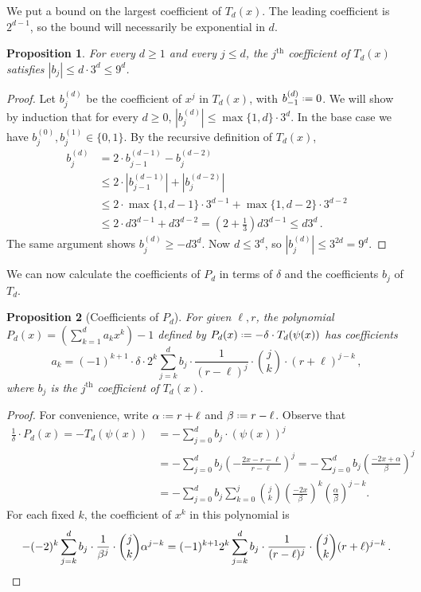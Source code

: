 \documentclass[10pt,a4paper]{article}
\newtheorem{proposition}{Proposition}[section]
\newcommand*{\define}{\mathrel{\vcenter{\baselineskip0.5ex \lineskiplimit0pt
                      \hbox{\scriptsize.}\hbox{\scriptsize.}}}%
                      =}
\newcommand{\zo}{\{0,1\}}
\begin{document}
We put a bound on the largest coefficient of $T_d(x)$. The leading coefficient is $2^{d-1}$, so the
bound will necessarily be exponential in $d$.

\begin{proposition}
\label{res:cheb_coefficient_ub}
For every $d \geq 1$ and every $j \leq d$, the $j^\text{th}$ coefficient of $T_d(x)$
satisfies $|b_j| \leq d \cdot 3^d \leq 9^d$.
\end{proposition}
\begin{proof}
Let $b^{(d)}_j$ be the coefficient of $x^j$ in $T_d(x)$, with $b^{(d)}_{-1} \define 0$. We will
show by induction that for every $d \ge 0$, $|b^{(d)}_j| \leq \max\{1,d\} \cdot 3^d$. In the base
case we have $b^{(0)}_j, b^{(1)}_j \in \zo$. By the recursive definition of $T_d(x)$,
\begin{align*}
  b^{(d)}_j &= 2 \cdot b^{(d-1)}_{j-1} - b^{(d-2)}_j \\
            &\leq 2 \cdot |b^{(d-1)}_{j-1}| + |b^{(d-2)}_j| \\
            &\leq 2 \cdot \max\{1,d-1\} \cdot 3^{d-1} + \max\{1,d-2\} \cdot 3^{d-2} \\
            &\leq 2 \cdot d 3^{d-1} + d 3^{d-2}
            = \left(2 + \frac{1}{3}\right) d 3^{d-1} \leq d 3^d \,.
\end{align*}
The same argument shows $b^{(d)}_j \geq - d 3^d$. Now $d \le 3^d$, so $|b^{(d)}_j| \leq 3^{2d} =
9^d$.
\end{proof}

We can now calculate the coefficients of $P_d$ in terms of $\delta$ and the coefficients $b_j$ of
$T_d$.

\begin{proposition}[Coefficients of $P_d$]
\label{res:coefficients_P}
For given $\ell, r$, the polynomial $P_d(x) = \left(\sum_{k=1}^d a_k x^k\right) - 1$ defined by
$P_d(x) \define -\delta \cdot T_d(\psi(x))$ has coefficients
\[
    a_k = (-1)^{k+1} \cdot 
    \delta \cdot 2^k \sum_{j=k}^d b_j \cdot \frac{1}{(r-\ell)^j} \cdot \binom{j}{k}
\cdot (r+\ell)^{j-k} \,,
\]
where $b_j$ is the $j^\text{th}$ coefficient of $T_d(x)$.
\end{proposition}
\begin{proof}
For convenience, write $\alpha \define r+\ell$ and $\beta \define r - \ell$.
Observe that
\begin{align*}
\frac{1}{\delta} \cdot P_d(x)
  = -T_d(\psi(x)) 
  &= -\sum_{j=0}^d b_j \cdot (\psi(x))^j \\
  &= -\sum_{j=0}^d b_j \left(-\frac{2x - r - \ell}{r - \ell}\right)^j 
   = -\sum_{j=0}^d b_j \left(\frac{-2x + \alpha}{\beta}\right)^j  \\
  &= -\sum_{j=0}^d b_j \sum_{k=0}^j \binom{j}{k}
        \left(\frac{-2x}{\beta}\right)^k \left(\frac{\alpha}{\beta}\right)^{j-k}.
\end{align*}
For each fixed $k$, the coefficient of $x^k$ in this polynomial is
\[
  -(-2)^k \sum_{j=k}^d b_j \cdot \frac{1}{\beta^j} \cdot \binom{j}{k} \alpha^{j-k} 
  = (-1)^{k+1} 2^k \sum_{j=k}^d b_j \cdot \frac{1}{(r-\ell)^j} \cdot \binom{j}{k} (r+\ell)^{j-k} \,.
  \qedhere
\]
\end{proof}
\end{document}
